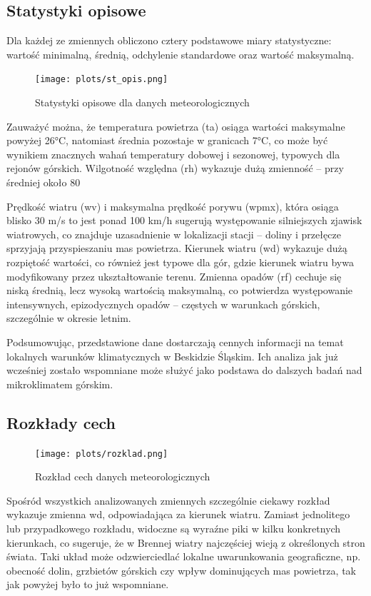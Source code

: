 \documentclass[10pt,a4paper]{article}
\begin{document}
\subsection*{Statystyki opisowe}
Dla każdej ze zmiennych obliczono cztery podstawowe miary statystyczne: wartość minimalną, średnią, odchylenie standardowe oraz wartość maksymalną.
\begin{figure}[H]
	\centering
	\texttt{[image: plots/st\_opis.png]}
	\caption{Statystyki opisowe dla danych meteorologicznych}
	\label{fig:my_label}
\end{figure}
Zauważyć można, że temperatura powietrza (ta) osiąga wartości maksymalne powyżej 26°C, natomiast średnia pozostaje w granicach 7°C, co może być wynikiem znacznych wahań temperatury dobowej i sezonowej, typowych dla rejonów górskich. Wilgotność względna (rh) wykazuje dużą zmienność – przy średniej około 80%
\par
\hspace{0.75cm}
Prędkość wiatru (wv) i maksymalna prędkość porywu (wpmx), która osiąga blisko 30 m/s to jest ponad 100 km/h sugerują występowanie silniejszych zjawisk wiatrowych, co znajduje uzasadnienie w lokalizacji stacji – doliny i przełęcze sprzyjają przyspieszaniu mas powietrza. Kierunek wiatru (wd) wykazuje dużą rozpiętość wartości, co również jest typowe dla gór, gdzie kierunek wiatru bywa modyfikowany przez ukształtowanie terenu. Zmienna opadów (rf) cechuje się niską średnią, lecz wysoką wartością maksymalną, co potwierdza występowanie intensywnych, epizodycznych opadów – częstych w warunkach górskich, szczególnie w okresie letnim.
\par
\hspace{0.75cm}
Podsumowując, przedstawione dane dostarczają cennych informacji na temat lokalnych warunków klimatycznych w Beskidzie Śląskim. Ich analiza jak już wcześniej zostało wspomniane może służyć jako podstawa do dalszych badań nad mikroklimatem górskim.

\subsection*{Rozkłady cech}
\begin{figure}[H]
	\centering
	\texttt{[image: plots/rozklad.png]}
	\caption{Rozkład cech danych meteorologicznych}
	\label{fig:my_label}
\end{figure}
Spośród wszystkich analizowanych zmiennych szczególnie ciekawy rozkład wykazuje zmienna wd, odpowiadająca za kierunek wiatru. Zamiast jednolitego lub przypadkowego rozkładu, widoczne są wyraźne piki w kilku konkretnych kierunkach, co sugeruje, że w Brennej wiatry najczęściej wieją z określonych stron świata. Taki układ może odzwierciedlać lokalne uwarunkowania geograficzne, np. obecność dolin, grzbietów górskich czy wpływ dominujących mas powietrza, tak jak powyżej było to już wspomniane.
\end{document}
